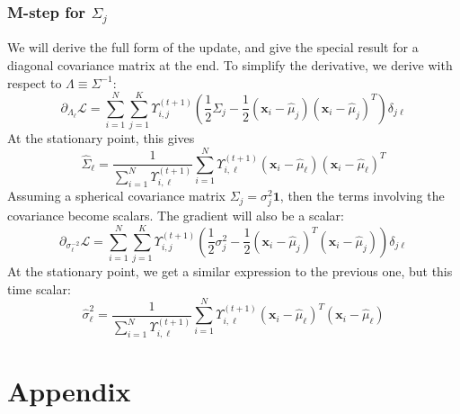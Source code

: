 \documentclass{article}
\numberwithin{equation}{section}
\theoremstyle{named}
\begin{document}
\subsubsection{M-step for $\Sigma_j$}
We will derive the full form of the update, and give the special result for a 
diagonal covariance matrix at the end. To simplify the derivative, we derive 
with respect to $\Lambda \equiv \Sigma^{-1}$:
\[
        \partial_{\Lambda_\ell} \mathcal{L} = \sum_{i = 1}^{N} \sum_{j = 1}^{K} 
        \Upsilon_{i, j}^{(t+1)}
        \left(\frac{1}{2} \Sigma_j 
                - \frac{1}{2}
        (\mathbf{x}_i - \hat{\mu}_j)(\mathbf{x}_i - \hat{\mu}_j)^{T} \right) \delta_{j \ell} 
\]
At the stationary point, this gives
\[
        \hat{\Sigma}_\ell =
        \frac{1}{\displaystyle\sum_{i = 1}^{N} \Upsilon_{i, \ell}^{(t+1)} } 
        \sum_{i = 1}^{N} \Upsilon_{i, \ell}^{(t + 1)} 
        (\mathbf{x}_i - \hat{\mu}_\ell)(\mathbf{x}_i - \hat{\mu}_\ell)^{T}
\]
Assuming a spherical covariance matrix $\Sigma_j = \sigma^{2}_j\mathbf{1}$, then 
the terms involving the covariance become scalars. The gradient will 
also be a scalar: 
\[
        \partial_{\sigma^{-2}_\ell} \mathcal{L} = 
        \sum_{i = 1}^{N} \sum_{j =1}^{K}
        \Upsilon_{i, j}^{(t + 1)}
        \left(  
                \frac{1}{2}\sigma^{2}_j - \frac{1}{2}(\mathbf{x}_i - \hat{\mu}_j)^{T} 
                (\mathbf{x}_i - \hat{\mu}_j)
\right)\delta_{j \ell}
\]
At the stationary point, we get a similar expression to the previous one, but this 
time scalar:
\[
       \boxed{ \hat{\sigma}^{2}_\ell = \frac{1}{\displaystyle 
        \sum_{i = 1}^{N} \Upsilon_{i, \ell}^{(t+1)}} 
        \sum_{i = 1}^{N} \Upsilon_{i,\ell}^{(t+1)} (\mathbf{x}_i - \hat{\mu}_\ell)^{T} 
(\mathbf{x}_i - \hat{\mu}_\ell)}
\]



\section{Appendix}
\end{document}
